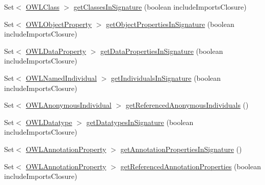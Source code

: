 \begin{DoxyCompactItemize}
\item 
Set$<$ \hyperlink{interfaceorg_1_1semanticweb_1_1owlapi_1_1model_1_1_o_w_l_class}{O\-W\-L\-Class} $>$ \hyperlink{classuk_1_1ac_1_1manchester_1_1cs_1_1owl_1_1owlapi_1_1_o_w_l_ontology_impl_a8209443262ca7e688179fbb03982b54c}{get\-Classes\-In\-Signature} (boolean include\-Imports\-Closure)
\item 
Set$<$ \hyperlink{interfaceorg_1_1semanticweb_1_1owlapi_1_1model_1_1_o_w_l_object_property}{O\-W\-L\-Object\-Property} $>$ \hyperlink{classuk_1_1ac_1_1manchester_1_1cs_1_1owl_1_1owlapi_1_1_o_w_l_ontology_impl_ae1b51a511e84c176b6fdf9004fdf986a}{get\-Object\-Properties\-In\-Signature} (boolean include\-Imports\-Closure)
\item 
Set$<$ \hyperlink{interfaceorg_1_1semanticweb_1_1owlapi_1_1model_1_1_o_w_l_data_property}{O\-W\-L\-Data\-Property} $>$ \hyperlink{classuk_1_1ac_1_1manchester_1_1cs_1_1owl_1_1owlapi_1_1_o_w_l_ontology_impl_a06b1689a1c015588173d89a6b35fd5ba}{get\-Data\-Properties\-In\-Signature} (boolean include\-Imports\-Closure)
\item 
Set$<$ \hyperlink{interfaceorg_1_1semanticweb_1_1owlapi_1_1model_1_1_o_w_l_named_individual}{O\-W\-L\-Named\-Individual} $>$ \hyperlink{classuk_1_1ac_1_1manchester_1_1cs_1_1owl_1_1owlapi_1_1_o_w_l_ontology_impl_ab828c30c260e4e668cf1b7371ba89c77}{get\-Individuals\-In\-Signature} (boolean include\-Imports\-Closure)
\item 
Set$<$ \hyperlink{interfaceorg_1_1semanticweb_1_1owlapi_1_1model_1_1_o_w_l_anonymous_individual}{O\-W\-L\-Anonymous\-Individual} $>$ \hyperlink{classuk_1_1ac_1_1manchester_1_1cs_1_1owl_1_1owlapi_1_1_o_w_l_ontology_impl_a6728a36d45037fa1283d35120fe1179e}{get\-Referenced\-Anonymous\-Individuals} ()
\item 
Set$<$ \hyperlink{interfaceorg_1_1semanticweb_1_1owlapi_1_1model_1_1_o_w_l_datatype}{O\-W\-L\-Datatype} $>$ \hyperlink{classuk_1_1ac_1_1manchester_1_1cs_1_1owl_1_1owlapi_1_1_o_w_l_ontology_impl_a12dd5cd8470ec6998d5e784b55caf22d}{get\-Datatypes\-In\-Signature} (boolean include\-Imports\-Closure)
\item 
Set$<$ \hyperlink{interfaceorg_1_1semanticweb_1_1owlapi_1_1model_1_1_o_w_l_annotation_property}{O\-W\-L\-Annotation\-Property} $>$ \hyperlink{classuk_1_1ac_1_1manchester_1_1cs_1_1owl_1_1owlapi_1_1_o_w_l_ontology_impl_aff6024e47b73e0887205111026684fd4}{get\-Annotation\-Properties\-In\-Signature} ()
\item 
Set$<$ \hyperlink{interfaceorg_1_1semanticweb_1_1owlapi_1_1model_1_1_o_w_l_annotation_property}{O\-W\-L\-Annotation\-Property} $>$ \hyperlink{classuk_1_1ac_1_1manchester_1_1cs_1_1owl_1_1owlapi_1_1_o_w_l_ontology_impl_a86a7eadd8e3fbec0dad423014e4bc64f}{get\-Referenced\-Annotation\-Properties} (boolean include\-Imports\-Closure)

\end{DoxyCompactItemize}
